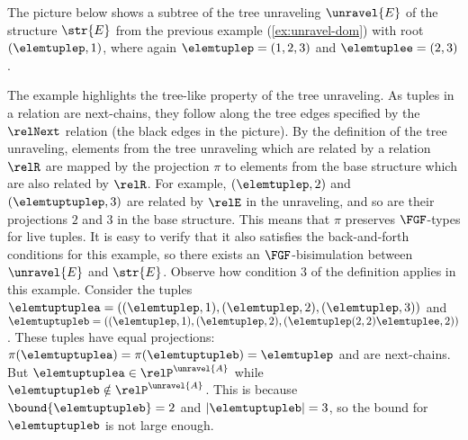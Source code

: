 \begin{example}
The picture below shows a subtree of the tree unraveling $\unravel{E}$ of the structure $\str{E}$ from the previous example (\cref{ex:unravel-dom}) with root $(\elemtuplep, 1)$, where again $\elemtuplep = (1,2,3)$ and $\elemtuplee = (2,3)$.
\begin{figure}[H]
  \centering
  
\end{figure}

\noindent
The example highlights the tree-like property of the tree unraveling.
As tuples in a relation are next-chains, they follow along the tree edges specified by the $\relNext$ relation (the black edges in the picture).
By the definition of the tree unraveling, elements from the tree unraveling which are related by a relation $\relR$ are mapped by the projection $\pi$ to elements from the base structure which are also related by $\relR$.
For example, $(\elemtuplep, 2)$ and $(\elemtuptuplep, 3)$ are related by $\relE$ in the unraveling, and so are their projections $2$ and $3$ in the base structure.
This means that $\pi$ preserves $\FGF$-types for live tuples.
It is easy to verify that it also satisfies the back-and-forth conditions for this example, so there exists an $\FGF$-bisimulation between $\unravel{E}$ and $\str{E}$.
Observe how condition 3 of the definition applies in this example.
Consider the tuples $\elemtuptuplea = ((\elemtuplep, 1), (\elemtuplep, 2), (\elemtuplep, 3))$ and $\elemtuptupleb = ((\elemtuplep, 1), (\elemtuplep, 2), (\elemtuplep(2,2)\elemtuplee, 2))$.
These tuples have equal projections: $\pi(\elemtuptuplea) = \pi(\elemtuptupleb) = \elemtuplep$ and are next-chains.
But $\elemtuptuplea \in \relP^{\unravel{A}}$ while $\elemtuptupleb \notin \relP^{\unravel{A}}$.
This is because $\bound{\elemtuptupleb} = 2$ and $|\elemtuptupleb| = 3$, so the bound for $\elemtuptupleb$ is not large enough.
\end{example}

